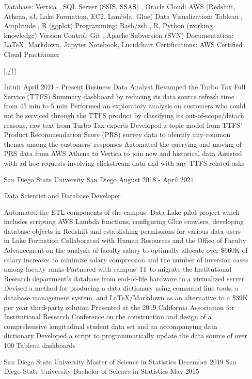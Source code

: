 \documentclass[12pt]{article}
\begin{document}

Database: 
Vertica
, SQL Server (SSIS, SSAS)
, Oracle
Cloud: AWS (Redshift, Athena, s3, Lake Formation, EC2, Lambda, Glue)
Data Visualization: Tableau
, Amplitude
, R (ggplot)
Programming: Bash/zsh
, R,
Python (working knowledge)
Version Control:
Git
, Apache Subversion (SVN)
Documentation: LaTeX, Markdown, Jupyter Notebook, Lucidchart
Certifications: AWS Certified Cloud Practitioner

\begin{enumerate}

\ref{./1}

\end{enumerate}

Intuit April 2021 - Present
Business Data Analyst
Revamped the Turbo Tax Full Service (TTFS) Summary dashboard by reducing its data source refresh time from 45 min to 5 min
Performed an exploratory analysis on customers who could not be serviced through the TTFS product by classifying its out-of-scope/detach reasons, raw text from Turbo Tax experts
Developed a topic model from TTFS’ Product Recommendation Score (PRS) survey data to identify any common themes among the customers’ responses
Automated the querying and moving of PRS data from AWS Athena to Vertica to join new and historical data
Assisted with ad-hoc requests involving clickstream data and with any TTFS-related asks

San Diego State University San Diego August 2018 - April 2021

Data Scientist and Database Developer

Automated the ETL components of the campus’ Data Lake pilot project which includes scripting AWS Lambda functions, configuring Glue crawlers, developing database objects in Redshift and establishing permissions for various data users in Lake Formation
Collaborated with Human Resources and the Office of Faculty Advancement on the analysis of faculty salary to optimally allocate over \$660K of salary increases to minimize salary compression and the number of inversion cases among faculty ranks
Partnered with campus’ IT to migrate the Institutional Research department’s database from end-of-life hardware to a virtualized server
Devised a method for producing a data dictionary using command line tools, a database management system, and LaTeX/Markdown as an alternative to a \$39K per year third-party solution
Presented at the 2019 California Association for Institutional Research Conference on the construction and design of a comprehensive longitudinal student data set and an accompanying data dictionary
Developed a script to programmatically update the data source of over 100 Tableau dashboards



San Diego State University Master of Science in Statistics December 2019
San Diego State University Bachelor of Science in Statistics May 2015
\end{document}
